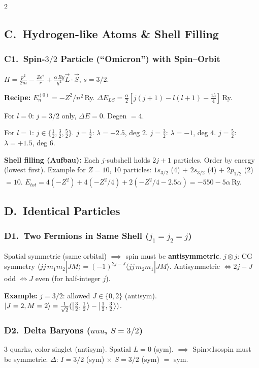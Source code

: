 \documentclass[9pt,a4paper]{article} %
\begin{document}
\begin{multicols}{2}
\subsection{C.\ Hydrogen-like Atoms \& Shell Filling}

\subsubsection{C1.\ Spin-$3/2$ Particle (``Omicron'') with Spin--Orbit}
$H=\frac{p^2}{2m}-\frac{Ze^2}{r}+\frac{\alpha\,Ry}{\hbar^2}\vec{L}\cdot\vec{S}$,\; $s=3/2$.

\textbf{Recipe:} $E_n^{(0)}=-Z^2/n^2$\,Ry.\;
$\Delta E_{LS}=\frac{\alpha}{2}[j(j+1)-l(l+1)-\frac{15}{4}]$\,Ry.

For $l=0$: $j=3/2$ only, $\Delta E=0$. Degen $=4$.

For $l=1$: $j\in\{\frac{1}{2},\frac{3}{2},\frac{5}{2}\}$.
$j=\frac{1}{2}$: $\lambda=-2.5$, deg $2$.\;
$j=\frac{3}{2}$: $\lambda=-1$, deg $4$.\;
$j=\frac{5}{2}$: $\lambda=+1.5$, deg $6$.

\textbf{Shell filling (Aufbau):} Each $j$-subshell holds $2j+1$ particles.
Order by energy (lowest first). Example for $Z=10$, 10 particles:
$1s_{3/2}$ (4) $+$ $2s_{3/2}$ (4) $+$ $2p_{1/2}$ (2) $=10$.
$E_{tot}=4(-Z^2)+4(-Z^2/4)+2(-Z^2/4-2.5\alpha)=\boxed{-550-5\alpha}$\,Ry.

\subsection{D.\ Identical Particles}

\subsubsection{D1.\ Two Fermions in Same Shell ($j_1=j_2=j$)}
Spatial symmetric (same orbital) $\implies$ spin must be \textbf{antisymmetric}.
$j\otimes j$: CG symmetry $\langle jj\,m_1 m_2|JM\rangle=(-1)^{2j-J}\langle jj\,m_2 m_1|JM\rangle$.
Antisymmetric $\iff 2j-J$ odd $\iff J$ even (for half-integer $j$).

\textbf{Example:} $j=3/2$: allowed $J\in\{0,2\}$ (antisym).\;
$\ket{J=2,M=2}=\frac{1}{\sqrt{2}}(\ket{\frac{3}{2},\frac{1}{2}}-\ket{\frac{1}{2},\frac{3}{2}})$.

\subsubsection{D2.\ Delta Baryons ($uuu$, $S=3/2$)}
3 quarks, color singlet (antisym). Spatial $L=0$ (sym).
$\implies$ Spin$\times$Isospin must be symmetric.
$\Delta$: $I=3/2$ (sym) $\times$ $S=3/2$ (sym) $=$ sym. \checkmark


\end{multicols}
\end{document}
